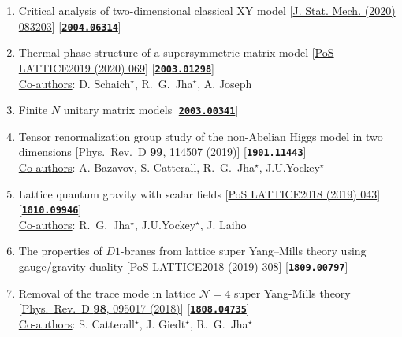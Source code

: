 \documentclass[article]{res}
\begin{document}
\begin{enumerate}
  \item Critical analysis of two-dimensional classical XY model [\href{https://iopscience.iop.org/article/10.1088/1742-5468/aba686/pdf}{J. Stat. Mech. (2020) 083203}] [\texttt{\textbf{\textcolor{blue}{\href{https://arxiv.org/abs/2004.06314}{2004.06314}}}}] 
 \vspace{2mm} 
  
 \item Thermal phase structure of a supersymmetric matrix model [\href{https://pos.sissa.it/363/069}{PoS LATTICE2019 (2020) 069}] [\texttt{\textbf{\textcolor{blue}{\href{https://arxiv.org/abs/2003.01298}{2003.01298}}}}] \\ 
\underline{Co-authors}: D. Schaich$^{\star}$, R.~G.~Jha$^{\star}$, A. Joseph
 \vspace{2mm} 
 
 \item  Finite $N$ unitary matrix models [\textbf{\texttt{\textcolor{blue}{\href{https://arxiv.org/abs/2003.00341}{2003.00341}}}}] 
 \vspace{2mm} 
 
  \item Tensor renormalization group study of the non-Abelian Higgs model in two dimensions [\href{https://journals.aps.org/prd/abstract/10.1103/PhysRevD.99.114507}{Phys.\ Rev.\ D {\bf 99}, 114507 (2019)}] [\texttt{\textbf{\textcolor{blue}{\href{https://arxiv.org/abs/1901.11443}{1901.11443}}}}]  \\ 
  \underline{Co-authors}: A. Bazavov, S. Catterall, R.~G.~Jha$^{\star}$, J.U.Yockey$^{\star}$
 \vspace{2mm} 
  
 \item  Lattice quantum gravity with scalar fields [\href{https://pos.sissa.it/334/043}{PoS LATTICE2018 (2019) 043}] [\texttt{\textbf{\textcolor{blue}{\href{https://arxiv.org/abs/1810.09946}{1810.09946}}}}] \\ 
 \underline{Co-authors}: R.~G.~Jha$^{\star}$, J.U.Yockey$^{\star}$, J. Laiho
 \vspace{2mm} 
 
  \item  The properties of $D1$-branes from lattice super Yang--Mills theory using gauge/gravity duality [\href{https://pos.sissa.it/334/308}{PoS LATTICE2018 (2019) 308}]   [\texttt{\textbf{\textcolor{blue}{\href{https://arxiv.org/abs/1809.00797}{1809.00797}}}}]
 \vspace{2mm} 
  
  \item  Removal of the trace mode in lattice $\mathcal{N }= 4$ super Yang-Mills theory [\href{https://journals.aps.org/prd/abstract/10.1103/PhysRevD.98.095017}{Phys.\ Rev.\ D {\bf 98}, 095017 (2018)}] [\texttt{\textbf{\texttt{\textcolor{blue}{\href{https://arxiv.org/abs/1808.04735}{1808.04735}}}}}]  \\
  \underline{Co-authors}: S. Catterall$^{\star}$, J. Giedt$^{\star}$, R.~G.~Jha$^{\star}$
 \vspace{2mm} 
  

\end{enumerate}
\end{document}
